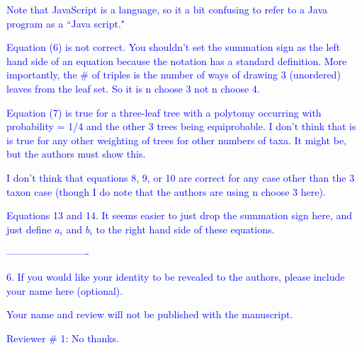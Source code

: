 \documentclass[11pt]{letter}
\begin{document}
\begin{letter}{}

\textcolor{blue}{Note that JavaScript is a language, so it a bit confusing to refer to a Java program as a ``Java script."}


\textcolor{blue}{Equation (6) is not correct. You shouldn't set the summation sign as the left hand side of an equation because the notation has a standard definition. More importantly, the $\#$ of triples is the number of ways of drawing 3 (unordered) leaves from the leaf set. So it is n choose 3 not n choose 4.}


\textcolor{blue}{Equation (7) is true for a three-leaf tree with a polytomy occurring with probability = 1/4 and the other 3 trees being equiprobable. I don't think that is is true for any other weighting of trees for other numbers of taxa. It might be, but the authors must show this.}


\textcolor{blue}{I don't think that equations 8, 9, or 10 are correct for any case other than the 3 taxon case (though I do note that the authors are using n choose 3 here).}


\textcolor{blue}{Equations 13 and 14. It seems easier to just drop the summation sign here, and just define $a_i$ and $b_i$ to the right hand side of these equations.}


\textcolor{blue}{-------------------------}

\textcolor{blue}{6. If you would like your identity to be revealed to the authors, please include your name here (optional).}


\textcolor{blue}{Your name and review will not be published with the manuscript.}


\textcolor{blue}{Reviewer $\#$ 1: No thanks.}



\end{letter}
\end{document}
